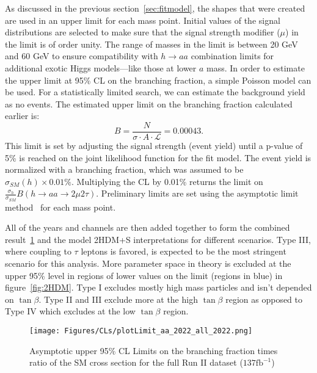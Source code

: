 As discussed in the previous section~\ref{sec:fitmodel}, the shapes that were created are used in an upper limit for each mass point. 
Initial values of the signal distributions are selected to make sure that the signal strength modifier ($\mu$) in the limit is of order unity. 
The range of masses in the limit is between 20 GeV and 60 GeV to ensure compatibility with $h \rightarrow a a $ combination limits for additional exotic Higgs models---like those at lower $a$ mass. 
In order to estimate the upper limit at 95\% CL on the branching fraction, a simple Poisson model can be used. For a statistically limited search, we can estimate the background yield as no events. The estimated upper limit on the branching fraction calculated earlier is: 
\begin{equation}B =  \frac{N}{\sigma \cdot A\cdot \mathcal{L}} = 0.00043  \text{.}\end{equation} 
This limit is set by adjusting the signal strength (event yield) until a p-value of 5\% is reached on the joint likelihood function for the fit model. 
The event yield is normalized with a branching fraction, which was assumed to be $\sigma_{SM}(h) \times 0.01\%$.
Multiplying the CL by 0.01\% returns the limit on $\frac{\sigma_h}{\sigma_{SM}} B(h\rightarrow aa\rightarrow2\mu2\tau)$.
Preliminary limits are set using the asymptotic limit method~\cite{Cowan_2011} for each mass point.


\clearpage

All of the years and channels are then added together to form the combined result~\ref{fig:CLsRunII} and the model 2HDM+S interpretations for different scenarios. Type III, where coupling to $\tau$ leptons is favored, is expected to be the most stringent scenario for this analysis. More parameter space in theory is excluded at the upper 95\% level in regions of lower values on the limit (regions in blue) in figure~\ref{fig:2HDM}. Type I excludes mostly high mass particles and isn't depended on $\tan\beta$. Type II and III exclude more at the high $\tan\beta$ region as opposed to Type IV which excludes at the low $\tan\beta$ region.

\begin{figure}[ht!b]
\label{fig:CLsRunII} 
\centering
  \texttt{[image: Figures/CLs/plotLimit\_aa\_2022\_all\_2022.png]}
    \caption{Asymptotic upper 95\% CL Limits on the branching fraction times ratio of the SM cross section for the full Run II dataset ($\text{137}\text{fb}^{-1}$)}
\end{figure}

